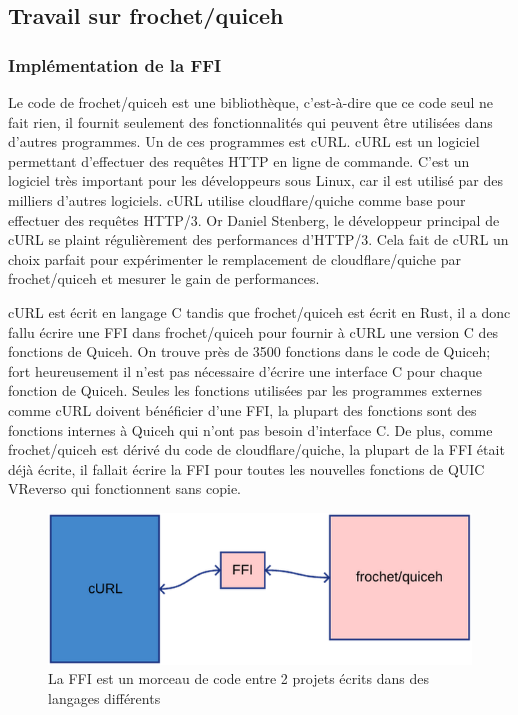 \subsection{Travail sur frochet/quiceh}

\subsubsection{Implémentation de la FFI}

Le code de frochet/quiceh est une bibliothèque, c'est-à-dire que ce code seul ne fait rien, il fournit seulement des fonctionnalités qui peuvent être utilisées dans d'autres programmes.
Un de ces programmes est cURL. cURL est un logiciel permettant d'effectuer des requêtes HTTP en ligne de commande. C'est un logiciel très important pour les développeurs sous Linux, car il est utilisé par des milliers d'autres logiciels.
cURL utilise cloudflare/quiche comme base pour effectuer des requêtes HTTP/3. Or Daniel Stenberg, le développeur principal de cURL se plaint régulièrement des performances d'HTTP/3. Cela fait de cURL un choix parfait pour expérimenter le remplacement de cloudflare/quiche par frochet/quiceh et mesurer le gain de performances.

cURL est écrit en langage C tandis que frochet/quiceh est écrit en Rust, il a donc fallu écrire une FFI dans frochet/quiceh pour fournir à cURL une version C des fonctions de Quiceh.
On trouve près de 3500 fonctions dans le code de Quiceh; fort heureusement il n'est pas nécessaire d'écrire une interface C pour chaque fonction de Quiceh. Seules les fonctions utilisées par les programmes externes comme cURL doivent bénéficier d'une FFI, la plupart des fonctions sont des fonctions internes à Quiceh qui n'ont pas besoin d'interface C.
De plus, comme frochet/quiceh est dérivé du code de cloudflare/quiche, la plupart de la FFI était déjà écrite, il fallait écrire la FFI pour toutes les nouvelles fonctions de QUIC VReverso qui fonctionnent sans copie.

\begin{figure}[H]
    \centering
    \includegraphics[height=0.15\textheight]{figures/curl_ffi_quiceh.png}
    \caption{La FFI est un morceau de code entre 2 projets écrits dans des langages différents}
\end{figure}

